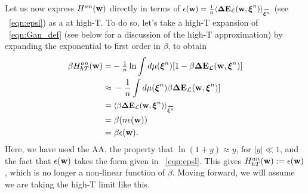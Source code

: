 

Let us now express $H^{an}({\mathbf{w}})$ directly in terms of $\EPSLw=\tfrac{1}{n}\langle\DETOPXI \rangle_{\AVGNDXIn}$ (see \EQN~\ref{eqn:epsl}) as a \ThermalAverage at high-T.
To do so, let's take a high-T expansion of \EQN~\ref{eqn:Gan_def} (see below for a discussion of the high-T approximation) by expanding the exponential to first order in $\beta$, to obtain
\begin{align}
\label{eqn:Gan_highT}
\beta\GANHT
=&  - \tfrac{1}{n}\ln \int d\mu(\NDXIn) [1-\beta \DETOPXI] \\ \nonumber
\approx&\;   - \frac{1}{n} \int d\mu(\NDXIn)\beta \DETOPXI] \\ \nonumber
=&\;\langle \beta\DETOPXI \rangle_{\AVGNDXIn} \\ \nonumber
=&\;\beta (n\EPSLw)\\ 
\label{eqn:Gan_highT_final}
=&\;\beta \EPSLw  .
\end{align}
Here, we have used the AA, the property that $\ln(1 + y) \approx y$, for $|y| \ll 1$, and the fact that $\epsilon({\mathbf{w}})$ takes the form given in \EQN~\ref{eqn:epsl}.
This gives $H^{an}_{hT}({\mathbf{w}}):=\epsilon({\mathbf{w}})$, which is no longer a non-linear function of $\beta$.
Moving forward, we will assume we are taking the high-T limit like this.

